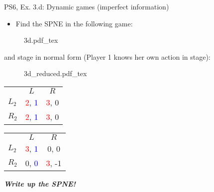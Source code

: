 \begin{frame}{PS6, Ex. 3.d: Dynamic games (imperfect information)}
    \begin{itemize}
      \item[(d)] Find the SPNE in the following game:
    \end{itemize}
    \vspace{-4pt}
    \begin{figure}[!h]
      \center
      \def\svgwidth{.8\columnwidth}
      {3d.pdf_tex}
    \end{figure}
    \vspace{-4pt}
     and  stage in normal form (Player 1 knows her own action in  stage):
    \vspace{-4pt}
    \begin{figure}[!h]
      \center
      \def\svgwidth{.25\columnwidth}
      {3d_reduced.pdf_tex}
    \end{figure}
    \vspace{-9pt}
    \begin{table}
      \begin{tabular}{l|c|c|}
        \multicolumn{1}{c}{} & \multicolumn{1}{c}{\color{blue}$L$} & \multicolumn{1}{c}{$R$} \\\cline{2-3}
        $L_2$ & \textcolor{red}{2}, \textcolor{blue}{1} & \textcolor{red}{3}, 0 \\\cline{2-3}
        $R_2$ & \textcolor{red}{2}, \textcolor{blue}{1} & \textcolor{red}{3}, 0 \\\cline{2-3}
      \end{tabular}
      \enskip
      \begin{tabular}{l|c|c|}
        \multicolumn{1}{c}{} & \multicolumn{1}{c}{\color{blue}$L$} & \multicolumn{1}{c}{$R$} \\\cline{2-3}
        $L_2$ & \textcolor{red}{3}, \textcolor{blue}{1} & 0, 0 \\\cline{2-3}
        $R_2$ & 0, \textcolor{blue}{0} & \textcolor{red}{3}, -1 \\\cline{2-3}
      \end{tabular}
    \end{table}
    \vspace{-4pt}
    \textbf{\textit{Write up the SPNE!}}
    \vfill\null
\end{frame}
